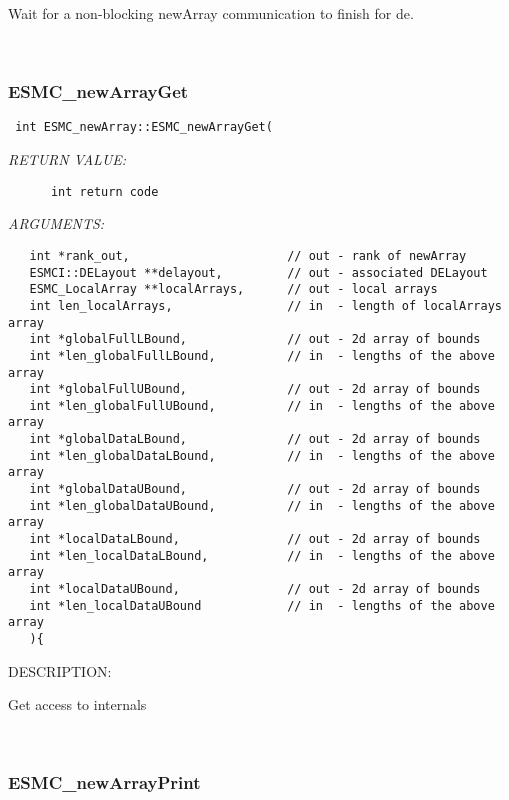       Wait for a non-blocking newArray communication to finish for de.
   
 
\mbox{}\hrulefill\
 
\subsubsection [ESMC\_newArrayGet] {ESMC\_newArrayGet}


  
\begin{verbatim} int ESMC_newArray::ESMC_newArrayGet(\end{verbatim}{\em RETURN VALUE:}
\begin{verbatim}      int return code\end{verbatim}{\em ARGUMENTS:}
\begin{verbatim}   int *rank_out,                      // out - rank of newArray
   ESMCI::DELayout **delayout,         // out - associated DELayout
   ESMC_LocalArray **localArrays,      // out - local arrays
   int len_localArrays,                // in  - length of localArrays array
   int *globalFullLBound,              // out - 2d array of bounds
   int *len_globalFullLBound,          // in  - lengths of the above array
   int *globalFullUBound,              // out - 2d array of bounds
   int *len_globalFullUBound,          // in  - lengths of the above array
   int *globalDataLBound,              // out - 2d array of bounds
   int *len_globalDataLBound,          // in  - lengths of the above array
   int *globalDataUBound,              // out - 2d array of bounds
   int *len_globalDataUBound,          // in  - lengths of the above array
   int *localDataLBound,               // out - 2d array of bounds
   int *len_localDataLBound,           // in  - lengths of the above array
   int *localDataUBound,               // out - 2d array of bounds
   int *len_localDataUBound            // in  - lengths of the above array
   ){\end{verbatim}
{\sf DESCRIPTION:\\ }


      Get access to internals
   
 
\mbox{}\hrulefill\
 
\subsubsection [ESMC\_newArrayPrint] {ESMC\_newArrayPrint}


